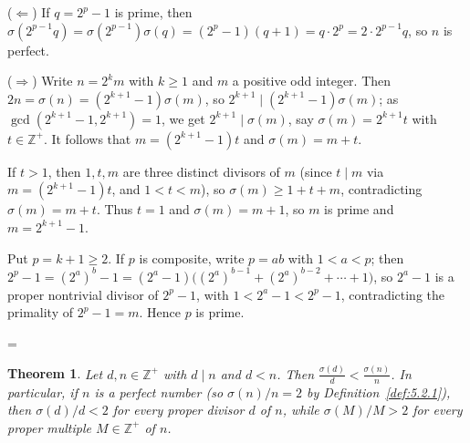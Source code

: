 \documentclass[11pt]{article}
\makeatletter
\theoremstyle{ntstyle}
\newtheorem{theorem}{Theorem}[subsection]
\let\nt@closedisplay\]
\def\nt@guardedclose{\@ifnextchar\par{\nt@closeafterpar}{\@ifnextchar\end{\postdisplaypenalty\@M\nt@closedisplay}{\nt@closedisplay}}}
\def\nt@closeafterpar\par{\@ifnextchar\par{\nt@closeafterpar}{\@ifnextchar\end{\postdisplaypenalty\@M\nt@closedisplay\par}{\nt@closedisplay\par}}}
\renewenvironment{proof}[1][\proofname]{\par
  \pushQED{\qed}\normalfont\topsep\medskipamount\edef\nt@afterproof{\@endparpenalty=\the\@endparpenalty\relax}\@beginparpenalty\@M\@endparpenalty\@M\let\]\nt@guardedclose\trivlist\item[]\textit{#1\@addpunct{.}} \ignorespaces}{\ifvmode\addpenalty\@M\fi\popQED\nt@afterproof\endtrivlist\@endpefalse}
\makeatother
\begin{document}
\begin{proof} ($\Leftarrow$) If $q = 2^p-1$ is prime,
	then $\sigma(2^{p-1}q) = \sigma(2^{p-1})\sigma(q) = (2^p-1)(q+1) =
		q\cdot 2^p = 2\cdot 2^{p-1}q$, so $n$ is perfect.

	($\Rightarrow$) Write $n=2^km$ with $k\ge1$ and $m$ a positive odd integer. Then $2n = \sigma(n) =
		(2^{k+1}-1)\sigma(m)$, so $2^{k+1}\mid (2^{k+1}-1)\sigma(m)$; as
	$\gcd(2^{k+1}-1, 2^{k+1})=1$, we get $2^{k+1}\mid\sigma(m)$, say
	$\sigma(m)=2^{k+1}t$ with $t\in\mathbb{Z}^+$. It follows that
	$m=(2^{k+1}-1)t$ and $\sigma(m)=m+t$.

	If $t>1$,
	then $1, t, m$ are three distinct divisors of $m$ (since $t\mid m$
	via $m=(2^{k+1}-1)t$, and $1<t<m$), so $\sigma(m)\ge 1+t+m$,
	contradicting $\sigma(m)=m+t$. Thus $t=1$ and $\sigma(m) = m+1$, so $m$
	is prime and $m=2^{k+1}-1$.

	Put $p=k+1\ge2$. If $p$ is composite, write $p =
		ab$ with $1 < a < p$; then $2^{p}-1 = (2^{a})^{b} - 1 =
			(2^{a}-1)\big((2^{a})^{b-1} + (2^{a})^{b-2} + \cdots + 1\big)$, so
	$2^{a}-1$ is a proper nontrivial divisor of $2^{p}-1$, with $1 < 2^{a}-1 < 2^{p}-1$, contradicting the primality of $2^{p}-1 = m$.
	Hence $p$ is prime.

\end{proof}
\begin{theorem}\label{thm:5.2.2} Let $d,n\in\mathbb{Z}^+$ with $d\mid n$ and
	$d<n$. Then
	$\tfrac{\sigma(d)}{d}<\tfrac{\sigma(n)}{n}$. In particular, if $n$ is
	a perfect number (so $\sigma(n)/n=2$ by Definition~\ref{def:5.2.1}), then
	$\sigma(d)/d<2$ for every proper divisor $d$ of $n$, while
	$\sigma(M)/M>2$ for every proper multiple $M\in\mathbb{Z}^+$ of $n$.

\end{theorem}
\end{document}
